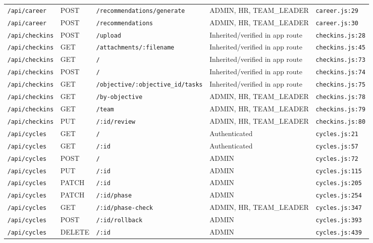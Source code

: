 \begin{landscape}
\begin{longtable}{p{}p{}p{}p{}p{}}
\texttt{/api/career} & POST & \texttt{/recommendations/generate} & ADMIN,  HR,  TEAM\_LEADER & \texttt{career.js:29}\\
\texttt{/api/career} & POST & \texttt{/recommendations} & ADMIN,  HR,  TEAM\_LEADER & \texttt{career.js:30}\\
\texttt{/api/checkins} & POST & \texttt{/upload} & Inherited/verified in app route & \texttt{checkins.js:28}\\
\texttt{/api/checkins} & GET & \texttt{/attachments/:filename} & Inherited/verified in app route & \texttt{checkins.js:45}\\
\texttt{/api/checkins} & GET & \texttt{/} & Inherited/verified in app route & \texttt{checkins.js:73}\\
\texttt{/api/checkins} & POST & \texttt{/} & Inherited/verified in app route & \texttt{checkins.js:74}\\
\texttt{/api/checkins} & GET & \texttt{/objective/:objective\_id/tasks} & Inherited/verified in app route & \texttt{checkins.js:75}\\
\texttt{/api/checkins} & GET & \texttt{/by-objective} & ADMIN,  HR,  TEAM\_LEADER & \texttt{checkins.js:78}\\
\texttt{/api/checkins} & GET & \texttt{/team} & ADMIN,  HR,  TEAM\_LEADER & \texttt{checkins.js:79}\\
\texttt{/api/checkins} & PUT & \texttt{/:id/review} & ADMIN,  HR,  TEAM\_LEADER & \texttt{checkins.js:80}\\
\texttt{/api/cycles} & GET & \texttt{/} & Authenticated & \texttt{cycles.js:21}\\
\texttt{/api/cycles} & GET & \texttt{/:id} & Authenticated & \texttt{cycles.js:57}\\
\texttt{/api/cycles} & POST & \texttt{/} & ADMIN & \texttt{cycles.js:72}\\
\texttt{/api/cycles} & PUT & \texttt{/:id} & ADMIN & \texttt{cycles.js:115}\\
\texttt{/api/cycles} & PATCH & \texttt{/:id} & ADMIN & \texttt{cycles.js:205}\\
\texttt{/api/cycles} & PATCH & \texttt{/:id/phase} & ADMIN & \texttt{cycles.js:254}\\
\texttt{/api/cycles} & GET & \texttt{/:id/phase-check} & ADMIN,  HR,  TEAM\_LEADER & \texttt{cycles.js:347}\\
\texttt{/api/cycles} & POST & \texttt{/:id/rollback} & ADMIN & \texttt{cycles.js:393}\\
\texttt{/api/cycles} & DELETE & \texttt{/:id} & ADMIN & \texttt{cycles.js:439}\\

\end{longtable}
\end{landscape}
